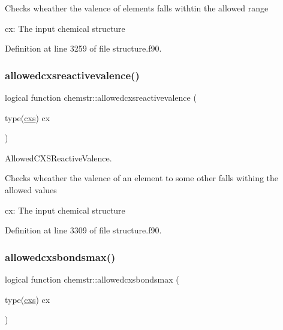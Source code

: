 Checks wheather the valence of elements falls withtin the allowed range


\begin{DoxyItemize}
\item cx\+: The input chemical structure 
\end{DoxyItemize}

Definition at line 3259 of file structure.\+f90.

\mbox{\label{namespacechemstr_a02c610963e45aa224298fd48ff988cb2}} 
\subsubsection{\texorpdfstring{allowedcxsreactivevalence()}{allowedcxsreactivevalence()}}
{\footnotesize\ttfamily logical function chemstr\+::allowedcxsreactivevalence (\begin{DoxyParamCaption}\item[{type(\mbox{\hyperlink{structchemstr_1_1cxs}{cxs}})}]{cx }\end{DoxyParamCaption})}



Allowed\+C\+X\+S\+Reactive\+Valence. 

Checks wheather the valence of an element to some other falls withing the allowed values


\begin{DoxyItemize}
\item cx\+: The input chemical structure 
\end{DoxyItemize}

Definition at line 3309 of file structure.\+f90.

\mbox{\label{namespacechemstr_aaa24f03941c25ca1496329ce1ad0a755}} 
\subsubsection{\texorpdfstring{allowedcxsbondsmax()}{allowedcxsbondsmax()}}
{\footnotesize\ttfamily logical function chemstr\+::allowedcxsbondsmax (\begin{DoxyParamCaption}\item[{type(\mbox{\hyperlink{structchemstr_1_1cxs}{cxs}})}]{cx }\end{DoxyParamCaption})}



